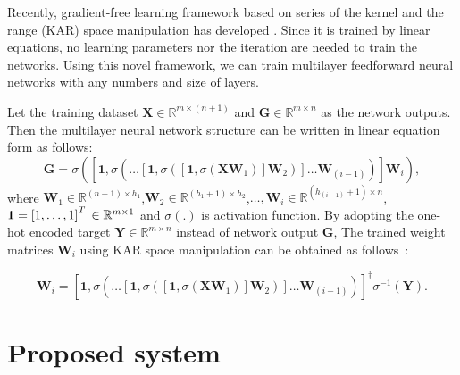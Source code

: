\documentclass[runningheads]{llncs}
\begin{document}
Recently, gradient-free learning framework based on series of the kernel and the range (KAR) space manipulation has developed \cite{toh2018learning,toh2018gradient}.
Since it is trained by linear equations, no learning parameters nor the iteration are needed to train the networks.
Using this novel framework, we can train multilayer feedforward neural networks with any numbers and size of layers.

Let the training dataset $\mathbf{X}\in{\mathbb{R}}^{m \times (n+1)}$ and $\mathbf{G}\in{\mathbb{R}}^{m \times n}$ as the network outputs.
Then the multilayer neural network structure can be written in linear equation form as follows:
\begin{equation}
    \mathbf{G} = \sigma\left(\left[\mathbf{1},\sigma\left(\dots\left[\mathbf{1},\sigma\left(\left[\mathbf{1},\sigma\left(\mathbf{X}\mathbf{W}_{1}\right)\right]\mathbf{W}_{2}\right)\right]\dots\mathbf{W}_{(i-1)}\right)\right]\mathbf{W}_{i}\right),
\end{equation}
where $\mathbf{W}_{1}\in{\mathbb{R}}^{(n+1) \times h_{1}}$,$\mathbf{W}_{2}\in{\mathbb{R}}^{(h_{1}+1) \times h_{2}}$,$\dots,\mathbf{W}_{i}\in{\mathbb{R}}^{(h_{(i-1)}+1) \times n}$,$\mathbf{1}=\left[1,\dots,1\right]^{T}\\
\in{\mathbb{R}}^{m \times 1}$ and $\sigma(.)$ is activation function.
By adopting the one-hot encoded target $\mathbf{Y}\in{\mathbb{R}}^{m \times n}$ instead of network output $\mathbf{G}$, The trained weight matrices $\mathbf{W}_{i}$ using KAR space manipulation can be obtained as follows~\cite{toh2018gradient}:

\begin{equation}
    \mathbf{W}_{i} = \left[\mathbf{1},\sigma\left(\dots\left[\mathbf{1},\sigma\left(\left[\mathbf{1},\sigma\left(\mathbf{X}\mathbf{W}_{1}\right)\right]\mathbf{W}_{2}\right)\right]\dots\mathbf{W}_{(i-1)}\right)\right]^{\dagger}\sigma^{-1}\left(\mathbf{Y}\right).
\end{equation}



\section{Proposed system}
\end{document}
